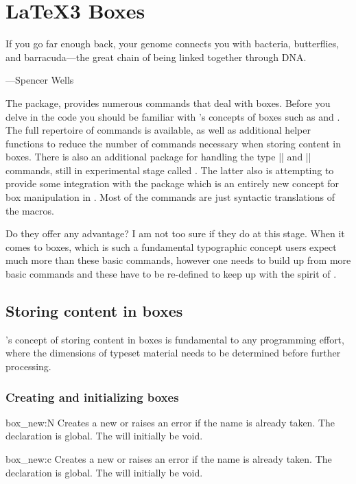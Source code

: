 \chapter{LaTeX3 Boxes}

\epigraph{If you go far enough back, your genome connects you with bacteria, butterflies, and barracuda---the great chain of being linked together through DNA.}{---Spencer Wells}

The  package, provides numerous commands that deal with boxes. Before you delve in the code you should be familiar with \tex’s concepts of boxes such as  and . The full repertoire of commands is available, as well as additional helper functions to reduce the number of commands necessary when storing content in boxes. There is also an additional package for handling the \latexe type |\fbox| and |\makebox| commands, still in experimental stage called . The latter also is attempting to provide some integration with the  package which is an entirely new concept for box manipulation in . Most of the commands are just syntactic translations of the \latexe macros. 

Do they offer any advantage? I am not too sure if they do at this stage. When it comes to boxes, which is such a fundamental typographic concept users expect much more than these basic commands, however one needs to build up from more basic commands and these have to be re-defined to keep up with the spirit of .

\section{Storing content in boxes}

\tex’s concept of storing content in boxes is fundamental to any programming effort, where the dimensions of typeset material needs to be determined before further processing.

\subsection{Creating and initializing boxes}
\begin{docCommand}{box_new:N} {  }
   Creates a new  or raises an error if the name is
   already taken. The declaration is global. The  will
   initially be void.
\end{docCommand}
\begin{docCommand}{box_new:c}{}
   Creates a new  or raises an error if the name is
   already taken. The declaration is global. The  will
   initially be void.
\end{docCommand}

